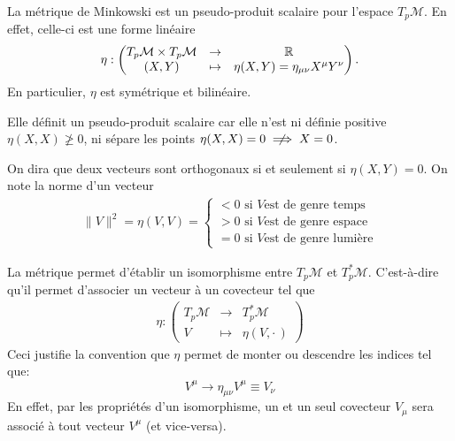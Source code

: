 \begin{theoremframe}
    \begin{defi}
        La métrique de Minkowski est un pseudo-produit scalaire pour l'espace $T_p\mathcal{M}$. En effet, celle-ci est une forme linéaire 
        \begin{align}
        \eta:\begin{pmatrix}
             T_p\mathcal{M} \times T_p\mathcal{M} & \to & \mathbb{R}\\
            (X,Y) & \mapsto & \eta(X,Y) = \eta_{\mu  \nu }X^{\mu}Y^{\nu}
        \end{pmatrix}.
        \end{align}
        En particulier, $\eta$ est symétrique et bilinéaire.
    \end{defi}   
\end{theoremframe}
\begin{rmk}
    Elle définit un pseudo-produit scalaire car elle n'est ni définie positive $\eta(X,X) \ngeq 0$, ni sépare les points $\eta(X,X) = 0 \centernot \implies X = 0$.
\end{rmk}
On dira que deux vecteurs sont orthogonaux si et seulement si $\eta (X, Y) = 0$. On note la norme d'un vecteur
\begin{align*}
    \lVert V \rVert ^2 = \eta (V, V) = \left\{
\begin{array}{l}
  < 0 \text{ si } V \text{est de genre temps} \\
  > 0 \text{ si } V \text{est de genre espace}\\
  = 0 \text{ si } V \text{est de genre lumière}
\end{array}
\right.
\end{align*}

La métrique permet d'établir un isomorphisme entre $T_{p}\mathcal{M} $ et $T^*_{p}\mathcal{M}$. C'est-à-dire qu'il permet d'associer un vecteur à un covecteur tel que
\begin{align*}
    \eta : \begin{pmatrix}
        T_{p}\mathcal{M} &\to & T^*_{p}\mathcal{M}\\
             V &\mapsto &\eta (V, \cdot\,)
    \end{pmatrix}
\end{align*}
Ceci justifie la convention que $\eta$ permet de monter ou descendre les indices tel que:
\begin{equation*}
    V^{\mu} \rightarrow \eta_{\mu \nu}V^{\mu} \equiv V_{\nu}
\end{equation*}
En effet, par les propriétés d'un isomorphisme, un et un seul covecteur $V_\mu$ sera associé à tout vecteur $V^\mu$ (et vice-versa).
